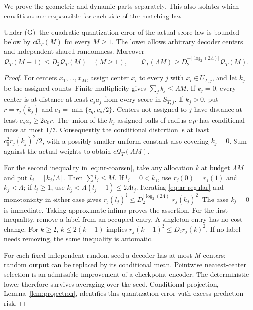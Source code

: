 We prove the geometric and dynamic parts separately. This also isolates which conditions are responsible for each side of the matching law.

\begin{lemma}\label{lem:nr-overlap}
Under \textup{(G)}, the quadratic quantization error of the actual score law is bounded below by $c\mathcal Q_T(M)$ for every $M\ge1$. The lower allows arbitrary decoder centers and independent shared randomness. Moreover,
\begin{equation}\label{eq:nr-coarsen}
 \mathcal Q_T(M-1)\le D_2\mathcal Q_T(M)\quad(M\ge1),\qquad
 \mathcal Q_T(\Lambda M)\ge D_2^{-\lceil\log_2(2\Lambda)\rceil}\mathcal Q_T(M).
\end{equation}
\end{lemma}
\begin{proof}
For centers $x_1,\ldots,x_M$, assign center $x_l$ to every $j$ with $x_l\in U_{T,j}$, and let $k_j$ be the assigned counts. Finite multiplicity gives $\sum_jk_j\le\Lambda M$. If $k_j=0$, every center is at distance at least $c_sa_j$ from every score in $S_{T,j}$. If $k_j>0$, put $r=r_j(k_j)$ and $c_0=\min\{c_g,c_s/2\}$. Centers not assigned to $j$ have distance at least $c_sa_j\ge2c_0r$. The union of the $k_j$ assigned balls of radius $c_0r$ has conditional mass at most $1/2$. Consequently the conditional distortion is at least $c_0^2r_j(k_j)^2/2$, with a possibly smaller uniform constant also covering $k_j=0$. Sum against the actual weights to obtain $c\mathcal Q_T(\Lambda M)$.

For the second inequality in \eqref{eq:nr-coarsen}, take any allocation $k$ at budget $\Lambda M$ and put $l_j=\lfloor k_j/\Lambda\rfloor$. Then $\sum l_j\le M$. If $l_j=0<k_j$, use $r_j(0)=r_j(1)$ and $k_j<\Lambda$; if $l_j\ge1$, use $k_j<\Lambda(l_j+1)\le2\Lambda l_j$. Iterating \eqref{eq:nr-regular} and monotonicity in either case gives $r_j(l_j)^2\le D_2^{\lceil\log_2(2\Lambda)\rceil}r_j(k_j)^2$. The case $k_j=0$ is immediate. Taking approximate infima proves the assertion. For the first inequality, remove a label from an occupied entry. A singleton entry has no cost change. For $k\ge2$, $k\le2(k-1)$ implies $r_j(k-1)^2\le D_2r_j(k)^2$. If no label needs removing, the same inequality is automatic.

For each fixed independent random seed a decoder has at most $M$ centers; random output can be replaced by its conditional mean. Pointwise nearest-center selection is an admissible improvement of a checkpoint encoder. The deterministic lower therefore survives averaging over the seed. Conditional projection, Lemma~\ref{lem:projection}, identifies this quantization error with excess prediction risk.
\end{proof}

